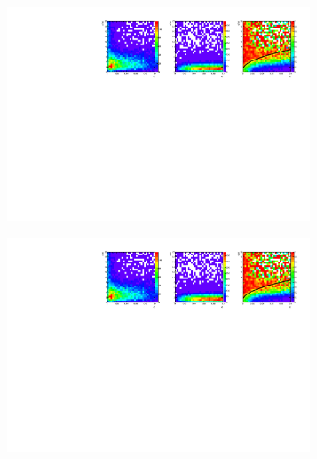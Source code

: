 \begin{figure}[H]
	\centering
	\begin{subfigure}{0.33\textwidth}
		\includegraphics[clip, trim=0.1cm 0cm 13.9cm 0cm,width=0.99\textwidth]{ILD/plots/recovery-purity.pdf}
		\caption{\label{fig:RecoveryPurity_a_3} }
	\end{subfigure}%
	\begin{subfigure}{0.33\textwidth}
		\centering
		\includegraphics[clip, trim=6.78cm 0cm 7.3cm 0cm,width=0.99\textwidth]{ILD/plots/recovery-purity.pdf}
		\caption{\label{fig:RecoveryPurity_b_3} }
	\end{subfigure}
	\begin{subfigure}{0.33\textwidth}
		\centering

\end{subfigure}
\end{figure}
